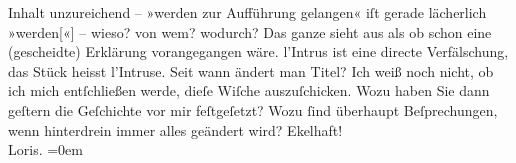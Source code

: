 \begin{ledgroupsized}[t]{13cm}
               Inhalt unzureichend – »werden zur Aufführung gelangen« iſt gerade lächerlich
                  »werden{[}«{]} – wieso? von wem? wodurch?\pend
           \pstart
           Das ganze sieht aus als ob schon eine (gescheidte) Erklärung vorangegangen wäre. l’Intrus ist eine directe Verfälschung, das Stück
               heisst l’Intruse. {\pb}Seit wann ändert man Titel?\pend
           \pstart
           Ich weiß noch nicht, ob ich mich entſchließen werde, dieſe Wiſche auszuſchicken. Wozu
               haben Sie dann geſtern die Geſchichte vor mir feſtgeſetzt? Wozu ſind überhaupt
               Beſprechungen, wenn hinterdrein immer alles geändert wird?\pend
           \pstart
           Ekelhaft!{\\[\baselineskip]}\spacefill\mbox{Loris.}\pend
           \leftskip=0em{}
         
         \endnumbering{}\end{ledgroupsized}  \newcommand{\dateiname}{L00092}\newcommand{\titel}{Hugo von Hofmannsthal an Arthur Schnitzler, [4. 4. 1892?]}\newcommand{\editorInnen}{Martin Anton Müller und Gerd-Hermann Susen}
      